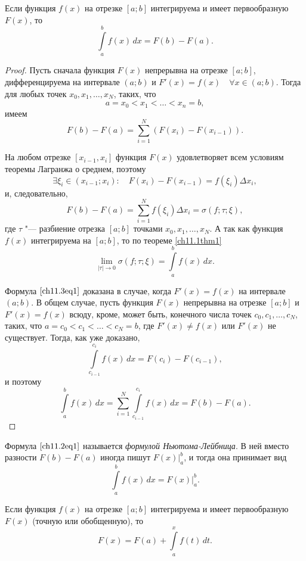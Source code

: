 \begin{thm}
Если функция $f(x)$ на отрезке $[a; b]$ интегрируема и имеет первообразную $F(x)$, то
\begin{equation} \label{ch11.3eq1}
\int\limits_{a}^{b} f(x) \,dx = F(b) - F(a).
\end{equation}
\end{thm}

\begin{proof}
Пусть сначала функция $F(x)$ непрерывна на отрезке $[a;b]$, дифференцируема на интервале $(a;b)$ и $F'(x) = f(x) \quad \forall x \in (a;b)$. Тогда для любых точек $x_0, x_1, \ldots, x_N$, таких, что
$$
a = x_0 < x_1 < \ldots < x_n = b,
$$
имеем
$$
F(b) - F(a) = \sum_{i = 1}^{N} \left( F(x_i) - F(x_{i - 1}) \right).
$$

На любом отрезке $[x_{i - 1}, x_i]$ функция $F(x)$ удовлетворяет всем условиям теоремы Лагранжа о среднем, поэтому
$$
\exists \xi_i \in (x_{i - 1}; x_i): \quad F(x_i) - F(x_{i - 1}) = f(\xi_i) \Delta x_i,
$$
и, следовательно,
$$
F(b) - F(a) = \sum_{i = 1}^{N} f(\xi_i) \Delta x_i = \sigma(f;\tau;\xi),
$$
где $\tau$ "--- разбиение отрезка $[a;b]$ точками $x_0, x_1, \ldots, x_N$. А так как функция $f(x)$ интегрируема на $[a;b]$, то по теореме  \ref{ch11.1thm1}
$$
\lim_{|\tau| \to 0} \sigma (f;\tau; \xi) = \int\limits_{a}^{b} f(x) \,dx.
$$

Формула $\eqref{ch11.3eq1}$ доказана в случае, когда $F'(x) = f(x)$ на интервале $(a;b)$. В общем случае, пусть функция $F(x)$ непрерывна на отрезке $[a;b]$ и $F'(x) = f(x)$ всюду, кроме, может быть, конечного числа точек $c_0, c_1, \ldots, c_N$, таких, что $a = c_0 < c_1 < \ldots < c_N = b$, где $F'(x) \not= f(x)$ или $F'(x)$ не существует. Тогда, как уже доказано,
$$
\int\limits_{c_{i - 1}}^{c_i} f(x) \,dx = F(c_i) - F(c_{i - 1}),
$$
и поэтому
\begin{equation*}
\int\limits_{a}^{b} f(x) \,dx = \sum_{i = 1}^{N} \int\limits_{c_{i - 1}}^{c_{i}} f(x) \,dx = F(b) - F(a). \tag*{$\qedhere$}
\end{equation*}
\end{proof}


Формула $\eqref{ch11.2eq1}$ называется \textit{формулой Ньютома-Лейбница}. В ней вместо разности $F(b) - F(a)$ иногда пишут $F(x)\big|_{a}^{b}$, и тогда она принимает вид
$$
\int\limits_{a}^{b} f(x) \,dx = F(x)\big|_{a}^{b}.
$$

\begin{cons}
Если функция $f(x)$ на отрезке $[a;b]$ интегрируема и имеет первообразную $F(x)$ (точную или обобщенную), то
$$
F(x) = F(a) + \int\limits_{a}^{x} f(t)\,dt.
$$
\end{cons}

